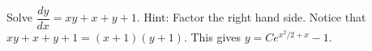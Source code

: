{Solve $\dfrac{dy}{dx} = xy+x+y+1$.  Hint: Factor the right hand side.}
{Notice that $xy+x+y+1=(x+1)(y+1)$. This gives $y=Ce^{x^2/2+x}-1$.}